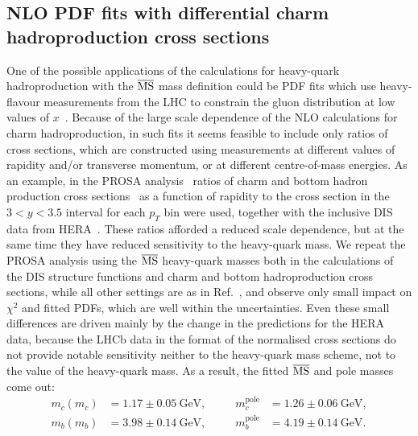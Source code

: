 \documentclass[12pt,a4paper]{article}
\newcommand{\msbar}{\ensuremath{\overline{\rm MS}}\xspace}
\begin{document}
\subsection{NLO PDF fits with differential charm hadroproduction cross sections}
One of the possible applications of the calculations for heavy-quark hadroproduction with the \msbar mass definition could be PDF fits which use heavy-flavour measurements from the LHC to constrain the gluon distribution at low values of $x$~\cite{Zenaiev:2015rfa,Gauld:2015yia,Gauld:2016kpd}. Because of the large scale dependence of the NLO calculations for charm hadroproduction, in such fits it seems feasible to include only ratios of cross sections, which are constructed using measurements at different values of rapidity and/or transverse momentum, or at different centre-of-mass energies. As an example, in the PROSA analysis~\cite{Zenaiev:2015rfa} ratios of charm and bottom hadron production cross sections~\cite{Aaij:2013mga,Aaij:2013noa} as a function of rapidity to the cross section in the $3 < y < 3.5$ interval for each $p_T$ bin were used, together with the inclusive DIS data from HERA~\cite{Aaron:2009aa,Abramowicz:1900rp,Abramowicz:2014zub}. These ratios afforded a reduced scale dependence, but at the same time they have reduced sensitivity to the heavy-quark mass. We repeat the PROSA analysis using the \msbar heavy-quark masses both in the calculations of the DIS structure functions and charm and bottom hadroproduction cross sections, while all other settings are as in Ref.~\cite{Zenaiev:2015rfa}, and observe only small impact on $\chi^2$ and fitted PDFs, which are well within the uncertainties. Even these small differences are driven mainly by the change in the predictions for the HERA data, because the LHCb data in the format of the normalised cross sections do not provide notable sensitivity neither to the heavy-quark mass scheme, not to the value of the heavy-quark mass. As a result, the fitted \msbar and pole masses come out:
\begin{equation}
\begin{aligned}
m_c(m_c) &= 1.17 \pm 0.05~\textrm{GeV},~~~~~~~~ &m_c^{\textrm{pole}} &= 1.26 \pm 0.06 ~\textrm{GeV},\\
m_b(m_b) &= 3.98 \pm 0.14 ~\textrm{GeV},~~~~~~~~ &m_b^{\textrm{pole}} &= 4.19 \pm 0.14 ~\textrm{GeV}.
\end{aligned}
\label{eq:dztocc}
\end{equation}
\end{document}
